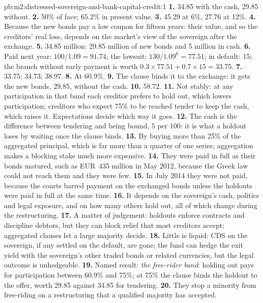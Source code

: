 \begin{solution}{pb:m2:distressed-sovereign-and-bank-capital-credit:1}
\textbf{1.} 34.85 with the cash, 29.85 without.
\textbf{2.} 50\% of face; 65.2\% in present value.
\textbf{3.} 45.29 at 6\%, 27.76 at 12\%.
\textbf{4.} Because the new bonds pay a low coupon for fifteen years: their value, and
so the creditors' real loss, depends on the market's view of the sovereign after the
exchange.
\textbf{5.} 34.85 million: 29.85 million of new bonds and 5 million in cash.
\textbf{6.} Paid next year: $100/1.09 = 91.74$; the lawsuit: $130/1.09^6 = 77.51$; in
default: 15; the branch without early payment is worth $0.3 \times 77.51 + 0.7 \times
15 = 33.75$.
\textbf{7.} 33.75; 34.73; 38.97.
\textbf{8.} At 60.9\%.
\textbf{9.} The clause binds it to the exchange: it gets the new bonds, 29.85, without
the cash.
\textbf{10.} 58.72.
\textbf{11.} Not stably: at any participation in that band each creditor prefers to hold
out, which lowers participation; creditors who expect 75\% to be reached tender to keep
the cash, which raises it. Expectations decide which way it goes.
\textbf{12.} The cash is the difference between tendering and being bound, 5 per 100: it
is what a holdout loses by waiting once the clause binds.
\textbf{13.} By buying more than 25\% of the aggregated principal, which is far more than
a quarter of one series; aggregation makes a blocking stake much more expensive.
\textbf{14.} They were paid in full as their bonds matured, such as EUR~435 million in
May 2012, because the Greek law could not reach them and they were few.
\textbf{15.} In July 2014 they were not paid, because the courts barred payment on the
exchanged bonds unless the holdouts were paid in full at the same time.
\textbf{16.} It depends on the sovereign's cash, politics and legal exposure, and on how
many others hold out, all of which change during the restructuring.
\textbf{17.} A matter of judgement: holdouts enforce contracts and discipline debtors,
but they can block relief that most creditors accept; aggregated clauses let a large
majority decide.
\textbf{18.} Little is liquid: CDS on the sovereign, if any settled on the default,
are gone; the fund can hedge the exit yield with the sovereign's other traded bonds or
related currencies, but the legal outcome is unhedgeable.
\textbf{19.} Named result: \emph{the free-rider band}: holding out pays for participation
between 60.9\% and 75\%; at 75\% the clause binds the holdout to the offer, worth 29.85
against 34.85 for tendering.
\textbf{20.} They stop a minority from free-riding on a restructuring that a
qualified majority has accepted.
\end{solution}

